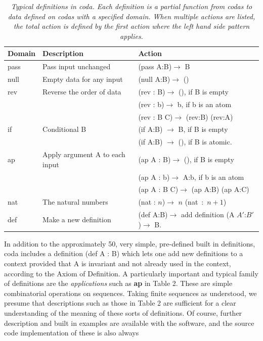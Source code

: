 \documentclass[11pt]{article}
\begin{document}
\begin{table}
\begin{tabular}{ | l | l | l | }
Domain & Description & Action \\
\hline
pass & Pass input unchanged & (pass A:B)$\rightarrow$ B \\
\hline
null & Empty data for any input & (null A:B)$\rightarrow$ () \\
\hline
rev & Reverse the order of data & (rev : B)$\rightarrow$ (), if B is empty \\
 &  & (rev : b)$\rightarrow$ b, if b is an atom \\
 & & (rev : B C)$\rightarrow$ (rev:B) (rev:A) \\ 
 \hline
 if & Conditional B & (if A:B) $\rightarrow$ B, if B is empty \\
 & & (if A:B) $\rightarrow$ (), if B is atomic. \\
 \hline 
 ap & Apply argument A to each input & (ap A : B)$\rightarrow$ (), if B is empty \\
  & & (ap A : b)$\rightarrow$ A:b, if b is an atom \\
  & & (ap A : B C)$\rightarrow$ (ap A:B) (ap A:C) \\  
\hline
nat & The natural numbers & (nat : $n$)$\rightarrow$ $n$ (nat\ :\ $n+1$) \\
\hline
def & Make a new definition & (def A:B)$\rightarrow$ add definition (A $A'$:$B'$)$\rightarrow$ B. \\
\hline 
\end{tabular}
\caption{\label{ }{\it Typical definitions in coda.  Each definition is a partial function from codas to data defined on  
codas with a specified domain.  When multiple actions are listed, the total action is defined by the first action 
where the left hand side pattern applies.}}
\end{table}
In addition to the approximately 50, very simple, pre-defined built in definitions, coda includes a definition (def A : B) which lets one 
add new definitions to a context provided that A is invariant and not already used in the context, according to the Axiom of Definition.
A particularly important and typical family of definitions are the {\it applications} such as {\bf ap} in Table 2.  These 
are simple combinatorial operations on sequences.  Taking finite sequences as understood, we presume that descriptions 
such as those in Table 2 are sufficient for a clear understanding of the meaning of these sorts of definitions.  Of course, further description and built in examples are available with the software, and the source code implementation of these is also always 
\end{document}
